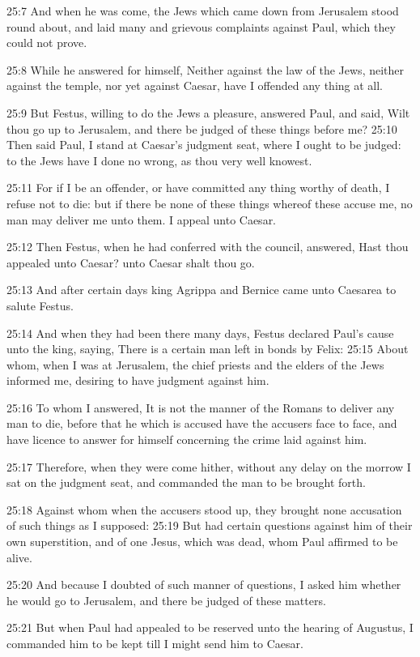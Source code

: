 25:7 And when he was come, the Jews which came down from Jerusalem
stood round about, and laid many and grievous complaints against Paul,
which they could not prove.

25:8 While he answered for himself, Neither against the law of the
Jews, neither against the temple, nor yet against Caesar, have I
offended any thing at all.

25:9 But Festus, willing to do the Jews a pleasure, answered Paul, and
said, Wilt thou go up to Jerusalem, and there be judged of these
things before me?  25:10 Then said Paul, I stand at Caesar's judgment
seat, where I ought to be judged: to the Jews have I done no wrong, as
thou very well knowest.

25:11 For if I be an offender, or have committed any thing worthy of
death, I refuse not to die: but if there be none of these things
whereof these accuse me, no man may deliver me unto them. I appeal
unto Caesar.

25:12 Then Festus, when he had conferred with the council, answered,
Hast thou appealed unto Caesar? unto Caesar shalt thou go.

25:13 And after certain days king Agrippa and Bernice came unto
Caesarea to salute Festus.

25:14 And when they had been there many days, Festus declared Paul's
cause unto the king, saying, There is a certain man left in bonds by
Felix: 25:15 About whom, when I was at Jerusalem, the chief priests
and the elders of the Jews informed me, desiring to have judgment
against him.

25:16 To whom I answered, It is not the manner of the Romans to
deliver any man to die, before that he which is accused have the
accusers face to face, and have licence to answer for himself
concerning the crime laid against him.

25:17 Therefore, when they were come hither, without any delay on the
morrow I sat on the judgment seat, and commanded the man to be brought
forth.

25:18 Against whom when the accusers stood up, they brought none
accusation of such things as I supposed: 25:19 But had certain
questions against him of their own superstition, and of one Jesus,
which was dead, whom Paul affirmed to be alive.

25:20 And because I doubted of such manner of questions, I asked him
whether he would go to Jerusalem, and there be judged of these
matters.

25:21 But when Paul had appealed to be reserved unto the hearing of
Augustus, I commanded him to be kept till I might send him to Caesar.

